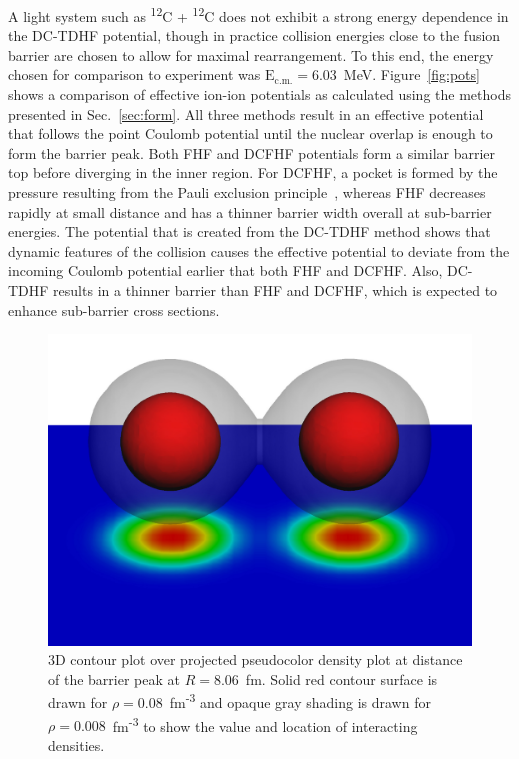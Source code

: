 A light system such as \textsuperscript{12}C + \textsuperscript{12}C does not exhibit a strong energy dependence in the DC-TDHF potential, though in practice collision energies close to the fusion barrier are chosen to allow for maximal rearrangement.
To this end, the energy chosen for comparison to experiment was $\mathrm{E_{c.m.}}=6.03$~MeV.
Figure~\ref{fig:pots} shows a comparison of effective ion-ion potentials as calculated using the methods presented in Sec.~\ref{sec:form}.
All three methods result in an effective potential that follows the point Coulomb potential until the nuclear overlap is enough to form the barrier peak.
Both FHF and DCFHF potentials form a similar barrier top before diverging in the inner region.
For DCFHF, a pocket is formed by the pressure resulting from the Pauli exclusion principle~\protect\citep{simenel2017}, whereas FHF decreases rapidly at small distance and has a thinner barrier width overall at sub-barrier energies.
The potential that is created from the DC-TDHF method shows that dynamic features of the collision causes the effective potential to deviate from the incoming Coulomb potential earlier that both FHF and DCFHF.
Also, DC-TDHF results in a thinner barrier than FHF and DCFHF, which is expected to enhance sub-barrier cross sections.

\begin{figure}
	\includegraphics*[width=\textwidth]{../Figures/CC/12C12CColl.pdf}
	\caption{3D contour plot over projected pseudocolor density plot at distance of the barrier peak at $R=8.06$~fm. Solid red contour surface is drawn for $\rho = 0.08$~fm\textsuperscript{-3} and opaque gray shading is drawn for $\rho = 0.008$~fm\textsuperscript{-3} to show the value and location of interacting densities.}
	\label{fig:dens}
\end{figure}


